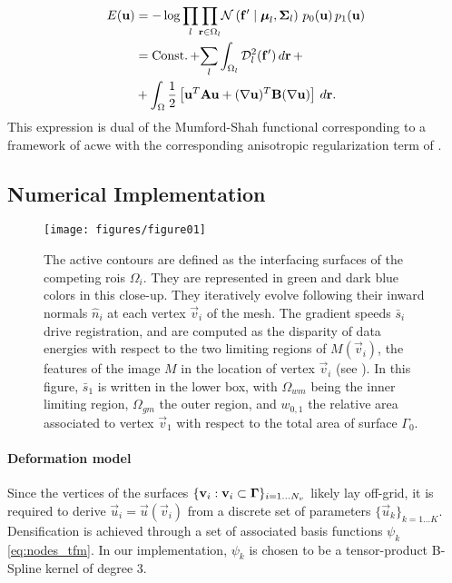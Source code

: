   \begin{align}
  E(\vec{u}) &= -\log \underset{l}{\prod}
  \underset{\vec{r} \in \Omega_l}{\prod}
  \mathcal{N} \left( \vec{f}' \mid \boldsymbol{\mu}_l, \boldsymbol{\Sigma}_l \right)\,p_0( \vec{u})\,p_1( \vec{u}) \notag\\
  &= \const + \underset{l}{\sum} \int_{\Omega_l}
  \mdist{f'}{l} \,d\vec{r} \, + \notag\\
  &+ \int_{\Omega} \frac12 \left[ \vec{u}^T \mathbf{A} \vec{u} + (\nabla \vec{u})^T \mathbf{B} (\nabla \vec{u}) \right] \,d\vec{r}.
  \label{eq:energy}
  \end{align}
%
This expression is dual of the Mumford-Shah functional corresponding
  to a framework of \acrlong*{acwe} \citep{chan_active_2001}
  with the corresponding anisotropic regularization term of \cite{nagel_investigation_1986}.


\subsection{Numerical Implementation}
\label{sec:numerical_implementation}

\begin{figure}
	\texttt{[image: figures/figure01]}
	\caption{The active contours are defined as the interfacing surfaces of the competing
	  \glspl{roi} $\Omega_i$.
	They are represented in green and dark blue colors in this close-up.
	They iteratively evolve following their inward normals $\hat{n}_i$ at each vertex
	  $\vec{v}_i$ of the mesh.
	The gradient speeds $\bar{s}_i$ drive registration, and are computed as the disparity of data
    energies with respect to the two limiting regions of $M(\vec{v}_i)$, the features of the image
    $M$ in the location of vertex $\vec{v}_i$ (see ).
	In this figure, $\bar{s}_1$ is written in the lower
	  box, with $\Omega_{wm}$ being the inner limiting region, $\Omega_{gm}$ the outer region, and
    $w_{0,1}$ the relative area associated to vertex $\vec{v}_1$ with respect to
    the total area of surface $\Gamma_0$.
	}\label{fig:method}
\end{figure}

\paragraph*{Deformation model}\label{sec:deformation_model}
Since the vertices of the surfaces $\{\mathbf{v}_i: \mathbf{v}_i \subset \boldsymbol{\Gamma} \}_{i=1 \ldots N_v}$
  likely lay off-grid, it is required to derive $\vec{u}_i = \vec{u}(\vec{v}_i)$ from a discrete set of parameters
  $\{\vec{u}_k\}_{k=1 \ldots K}$.
Densification is achieved through a set of associated basis functions $\psi_k$ \eqref{eq:nodes_tfm}.
In our implementation, $\psi_k$ is chosen to be a tensor-product B-Spline kernel
  of degree 3.

